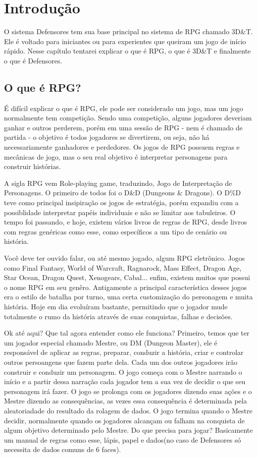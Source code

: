 \chapter{Introdução}

O sistema Defensores tem sua base principal no sistema de RPG chamado 3D\&T. Ele é voltado para iniciantes ou para experientes que queiram um jogo de início rápido. Nesse capítulo tentarei explicar o que é RPG, o que é 3D\&T e finalmente o que é Defensores. 

\section{O que é RPG?}

É difícil explicar o que é RPG, ele pode ser considerado um jogo, mas um jogo normalmente tem competição. Sendo uma competição, alguns jogadores deveriam ganhar e outros perderem, porém em uma sessão de RPG - nem é chamado de partida - o objetivo é todos jogadores se divertirem, ou seja, não há necessariamente ganhadores e perdedores. Os jogos de RPG possuem regras e mecânicas de jogo, mas o seu real objetivo é interpretar personagens para construir histórias. 

A sigla RPG vem Role-playing game, traduzindo, Jogo de Interpretação de Personagens. O primeiro de todos foi o D\&D (Dungeons \& Dragons). O D\%D  teve como principal insipiração os jogos de estratégia, porém expandiu com a possiblidade interpretar papéis individuais e não se limitar aos tabuleiros. O tempo foi passando, e hoje, existem vários livros de regras de RPG, desde livros com regras genéricas como esse, como específicos a um tipo de cenário ou história.

Você deve ter ouvido falar, ou até mesmo jogado, algum RPG eletrônico. Jogos como Final Fantasy, World of Warcraft, Ragnarock, Mass Effect, Dragon Age, Star Ocean, Dragon Quest, Xenogears, Cabal... enfim, existem muitos que possui o nome RPG em seu genêro. Antigamente a principal característica desses jogos era o estilo de batalha por turno, uma certa customização do personagem e muita história. Hoje em dia evoluíram bastante, permitindo que o jogador mude totalmente o rumo da história através de suas conquistas, falhas e decisões.

Ok até aqui? Que tal agora entender como ele funciona? Primeiro, temos que ter um jogador especial chamado Mestre, ou DM (Dungeon Master), ele é responsável de aplicar as regras, preparar, conduzir a história, criar e controlar outros persoangens que fazem parte dela. Cada um dos outros jogadores irão construir e conduzir um personagem. O jogo começa com o Mestre narrando o início e a partir dessa narração cada jogador tem a sua vez de decidir o que seu personagem irá fazer. O jogo se prolonga com os jogadores dizendo suas ações e o Mestre dizendo as consequências, as vezes essa consequência é determinada pela aleatoriadade do resultado da rolagem de dados. O jogo termina quando o Mestre decidir, normalmente quando os jogadores alcançam ou falham na conquista de algum objetivo determinado pelo Mestre. Do que precisa para jogar? Basicamente um manual de regras como esse, lápis, papel e dados(no caso de Defensores só necessita de dados comuns de 6 faces).


